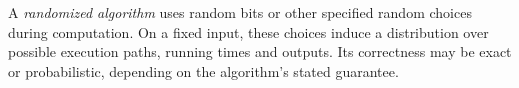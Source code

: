 
A \emph{randomized algorithm} uses random bits or other specified random choices during computation. On a fixed input, these choices induce a distribution over possible execution paths, running times and outputs. Its correctness may be exact or probabilistic, depending on the algorithm's stated guarantee.
